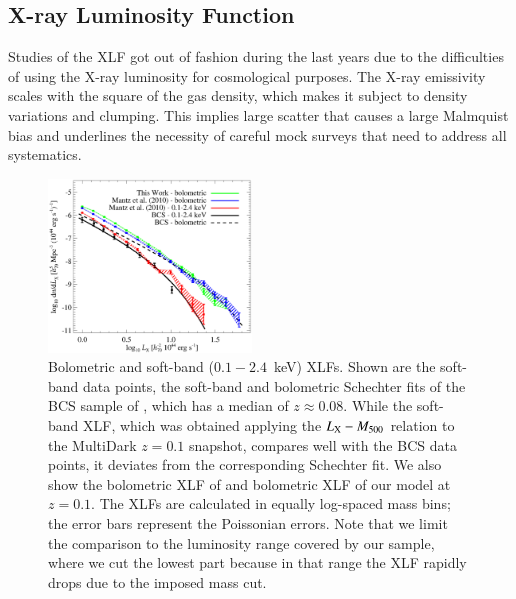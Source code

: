 \documentclass[useAMS,usenatbib]{mn2e}
\begin{document}
\subsection{X-ray Luminosity Function}
Studies of the XLF got out of fashion during the last years due to the
difficulties of using the X-ray luminosity for cosmological purposes. The X-ray
emissivity scales with the square of the gas density, which makes it subject to
density variations and clumping. This implies large scatter that causes a large
Malmquist bias and underlines the necessity of careful mock surveys that need to
address all systematics.

\begin{figure} 
\centering
\includegraphics[width=0.48\textwidth]{figures/xlf.eps}
\caption{Bolometric and soft-band ($0.1-2.4$~keV) XLFs. Shown are the soft-band
  data points, the soft-band and bolometric Schechter fits of the BCS sample of
  \protect\cite{1997ApJ...479L.101E}, which has a median of $z \approx 0.08$.  While the
  soft-band XLF, which was obtained applying the \protect\cite{2010MNRAS.406.1773M}
  $L_{{\mathrm{X}}}-M_{500}$ relation to the MultiDark $z = 0.1$ snapshot, compares
  well with the BCS data points, it deviates from the corresponding Schechter
  fit. We also show the bolometric XLF of \protect\cite{2010MNRAS.406.1773M} and
  bolometric XLF of our model at $z=0.1$. The XLFs are calculated in equally
  log-spaced mass bins; the error bars represent the Poissonian errors. Note
  that we limit the comparison to the luminosity range covered by our sample,
  where we cut the lowest part because in that range the XLF rapidly drops due
  to the imposed mass cut.}
\label{fig:XLF}
\end{figure}
\end{document}
